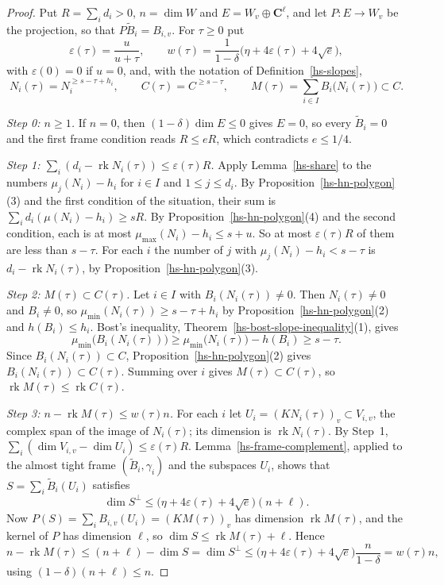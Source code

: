 \begin{proof}
Put $R=\sum_id_i>0$, $n=\dim W$ and $E=W_v\oplus\mathbf C^\ell$, and let $P:E\to W_v$ be the
projection, so that $P\tilde B_i=B_{i,v}$. For $\tau\geq0$ put
\[
 \varepsilon(\tau)=\frac u{u+\tau},\qquad
 w(\tau)=\frac1{1-\delta}\big(\eta+4\varepsilon(\tau)+4\sqrt e\big),
\]
with $\varepsilon(0)=0$ if $u=0$, and, with the notation of Definition~\ref{hs-slopes},
\[
 N_i(\tau)=N_i^{\geq s-\tau+h_i},\qquad C(\tau)=C^{\geq s-\tau},\qquad
 M(\tau)=\sum_{i\in I}B_i\big(N_i(\tau)\big)\subset C.
\]

\emph{Step 0: $n\geq1$.} If $n=0$, then $(1-\delta)\dim E\leq0$ gives $E=0$, so every
$\tilde B_i=0$ and the first frame condition reads $R\leq eR$, which contradicts $e\leq1/4$.

\emph{Step 1: $\sum_i(d_i-\operatorname{rk}N_i(\tau))\leq\varepsilon(\tau)R$.} Apply
Lemma~\ref{hs-share} to the numbers $\mu_j(N_i)-h_i$ for $i\in I$ and $1\leq j\leq d_i$. By
Proposition~\ref{hs-hn-polygon}(3) and the first condition of the situation, their sum is
$\sum_id_i(\mu(N_i)-h_i)\geq sR$. By Proposition~\ref{hs-hn-polygon}(4) and the second
condition, each is at most $\mu_{\max}(N_i)-h_i\leq s+u$. So at most $\varepsilon(\tau)R$ of them
are less than $s-\tau$. For each $i$ the number of $j$ with $\mu_j(N_i)-h_i<s-\tau$ is
$d_i-\operatorname{rk}N_i(\tau)$, by Proposition~\ref{hs-hn-polygon}(3).

\emph{Step 2: $M(\tau)\subset C(\tau)$.} Let $i\in I$ with $B_i(N_i(\tau))\neq0$. Then
$N_i(\tau)\neq0$ and $B_i\neq0$, so $\mu_{\min}(N_i(\tau))\geq s-\tau+h_i$ by
Proposition~\ref{hs-hn-polygon}(2) and $h(B_i)\leq h_i$. Bost's inequality,
Theorem~\ref{hs-bost-slope-inequality}(1), gives
\[
 \mu_{\min}\big(B_i(N_i(\tau))\big)\geq\mu_{\min}\big(N_i(\tau)\big)-h(B_i)\geq s-\tau .
\]
Since $B_i(N_i(\tau))\subset C$, Proposition~\ref{hs-hn-polygon}(2) gives
$B_i(N_i(\tau))\subset C(\tau)$. Summing over $i$ gives $M(\tau)\subset C(\tau)$, so
$\operatorname{rk}M(\tau)\leq\operatorname{rk}C(\tau)$.

\emph{Step 3: $n-\operatorname{rk}M(\tau)\leq w(\tau)n$.} For each $i$ let
$U_i=(KN_i(\tau))_v\subset V_{i,v}$, the complex span of the image of $N_i(\tau)$; its dimension
is $\operatorname{rk}N_i(\tau)$. By Step~1,
$\sum_i(\dim V_{i,v}-\dim U_i)\leq\varepsilon(\tau)R$. Lemma~\ref{hs-frame-complement}, applied
to the almost tight frame $(\tilde B_i,\gamma_i)$ and the subspaces $U_i$, shows that
$S=\sum_i\tilde B_i(U_i)$ satisfies
\[
 \dim S^\perp\leq\big(\eta+4\varepsilon(\tau)+4\sqrt e\big)(n+\ell).
\]
Now $P(S)=\sum_iB_{i,v}(U_i)=(KM(\tau))_v$ has dimension $\operatorname{rk}M(\tau)$, and the
kernel of $P$ has dimension $\ell$, so $\dim S\leq\operatorname{rk}M(\tau)+\ell$. Hence
\[
 n-\operatorname{rk}M(\tau)\leq(n+\ell)-\dim S=\dim S^\perp
 \leq\big(\eta+4\varepsilon(\tau)+4\sqrt e\big)\frac{n}{1-\delta}=w(\tau)n,
\]
using $(1-\delta)(n+\ell)\leq n$.


\end{proof}
